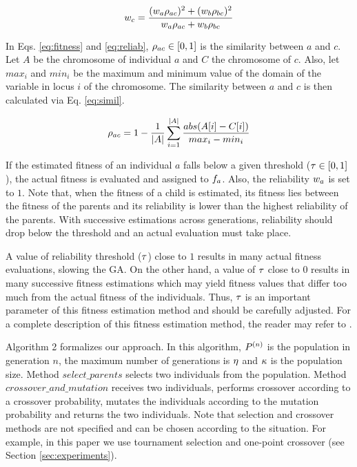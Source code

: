 \documentclass[conference]{IEEEtran}
\begin{document}
\begin{equation}
\label{eq:reliab}
\reliab{c} = \frac{(\reliab{a}\simil{a}{c})^2 + (\reliab{b}\simil{b}{c})^2}{\reliab{a}\simil{a}{c} + \reliab{b}\simil{b}{c}}
\end{equation}

In Eqs. \ref{eq:fitness} and \ref{eq:reliab}, $\rho_{ac} \in [0,1]$ is the similarity between $a$ and $c$. Let $A$ be the chromosome of individual $a$ and $C$ the chromosome of $c$. Also, let $max_i$ and $min_i$ be the maximum and minimum value of the domain of the variable in locus $i$ of the chromosome. The similarity between $a$ and $c$ is then calculated via Eq. \ref{eq:simil}.

\begin{equation}
\label{eq:simil}
\simil{a}{c} = 1 - \frac{1}{|A|} \sum_{i = 1}^{|A|} \frac{abs(A[i] - C[i])}{max_i - min_i}
\end{equation}

If the estimated fitness of an individual $a$ falls below a given threshold ($\tau \in [0,1]$), the actual fitness is evaluated and assigned to $f_{a}$. Also, the reliability $w_{a}$ is set to $1$. Note that, when the fitness of a child is estimated, its fitness lies between the fitness of the parents and its reliability is lower than the highest reliability of the parents. With successive estimations across generations, reliability should drop below the threshold and an actual evaluation must take place.


A value of reliability threshold ($\tau$) close to $1$ results in many actual fitness evaluations, slowing the GA. On the other hand, a value of $\tau$ close to $0$ results in many successive fitness estimations which may yield fitness values that differ too  much from the actual fitness of the individuals. Thus, $\tau$ is an important parameter of this fitness estimation method and should be carefully adjusted. For a complete description of this fitness estimation method, the reader may refer to \cite{Salami&Hendtlass2003}.

Algorithm 2 formalizes our approach. In this algorithm, $P^{(n)}$ is the population in generation $n$, the maximum number of generations is $\eta$ and $\kappa$ is the population size. Method $select\_parents$ selects two individuals from the population. Method $crossover\_and\_mutation$ receives two individuals, performs crossover according to a crossover probability, mutates the individuals according to the mutation probability and returns the two individuals. Note that selection and crossover methods are not specified and can be chosen according to the situation. For example, in this paper we use tournament selection and one-point crossover (see Section \ref{sec:experiments}).
\end{document}
